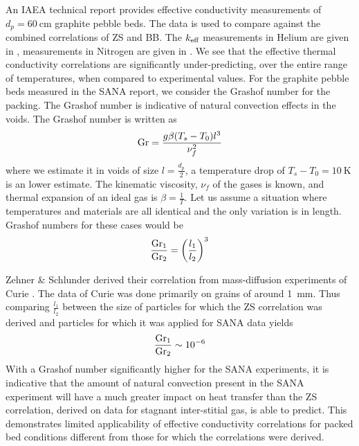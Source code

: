 An IAEA technical report provides effective conductivity measurements of $d_p = \SI{60}{\centi\meter}$ graphite pebble beds\cite{Report2000}. The data is used to compare against the combined correlations of ZS and BB. The $k_\text{eff}$ measurements in Helium are given in , measurements in Nitrogen are given in . We see that the effective thermal conductivity correlations are significantly under-predicting, over the entire range of temperatures, when compared to experimental values. For the graphite pebble beds measured in the SANA report, we consider the Grashof number for the packing. The Grashof number is indicative of natural convection effects in the voids. The Grashof number is written as
\begin{equation}
    \mathrm{Gr} = \frac{g\beta(T_s-T_0)l^3}{\nu_f^2}
\end{equation}
where we estimate it in voids of size $l = \frac{d_p}{2}$, a temperature drop of $T_s-T_0 = \SI{10}{\kelvin}$ is an lower estimate. The kinematic viscosity, $\nu_f$ of the gases is known, and thermal expansion of an ideal gas is $\beta = \frac{1}{T}$. Let us assume a situation where temperatures and materials are all identical and the only variation is in length. Grashof numbers for these cases would be
\begin{equation}
    \frac{\mathrm{Gr}_1}{\mathrm{Gr}_2} = \left(\frac{l_1}{l_2}\right)^3
\end{equation}

Zehner \& Schlunder derived their correlation from mass-diffusion experiments of Curie \cite{Currie2002}. The data of Curie was done primarily on grains of around \SI{1}{\milli\meter}. Thus comparing $\frac{l_1}{l_2}$ between the size of particles for which the ZS correlation was derived and particles for which it was applied for SANA data yields
\begin{equation}
    \frac{\mathrm{Gr}_1}{\mathrm{Gr}_2} \sim 10^{-6}
\end{equation}
With a Grashof number significantly higher for the SANA experiments, it is indicative that the amount of natural convection present in the SANA experiment will have a much greater impact on heat transfer than the ZS correlation, derived on data for stagnant inter-stitial gas, is able to predict. This demonstrates limited applicability of effective conductivity correlations for packed bed conditions different from those for which the correlations were derived.

